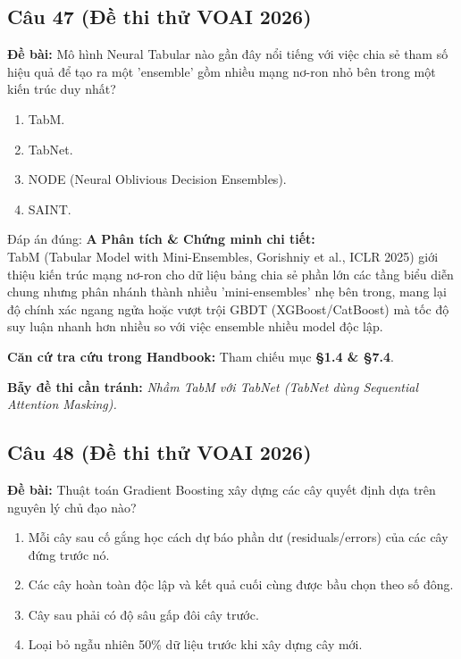 \documentclass[10pt,a4paper]{article}
\begin{document}
\subsection*{Câu 47 (Đề thi thử VOAI 2026)}
\textbf{Đề bài:} Mô hình Neural Tabular nào gần đây nổi tiếng với việc chia sẻ tham số hiệu quả để tạo ra một 'ensemble' gồm nhiều mạng nơ-ron nhỏ bên trong một kiến trúc duy nhất?

\begin{enumerate}[label=\textbf{\Alph*.}]
    \item TabM.
    \item TabNet.
    \item NODE (Neural Oblivious Decision Ensembles).
    \item SAINT.
\end{enumerate}

\begin{solbox}{Đáp án đúng: \textbf{A}}
\textbf{Phân tích \& Chứng minh chi tiết:} \\
TabM (Tabular Model with Mini-Ensembles, Gorishniy et al., ICLR 2025) giới thiệu kiến trúc mạng nơ-ron cho dữ liệu bảng chia sẻ phần lớn các tầng biểu diễn chung nhưng phân nhánh thành nhiều 'mini-ensembles' nhẹ bên trong, mang lại độ chính xác ngang ngửa hoặc vượt trội GBDT (XGBoost/CatBoost) mà tốc độ suy luận nhanh hơn nhiều so với việc ensemble nhiều model độc lập.

\vspace{0.4em}
\textbf{Căn cứ tra cứu trong Handbook:} Tham chiếu mục \textbf{§1.4 \& §7.4}.

\vspace{0.4em}
\textbf{Bẫy đề thi cần tránh:} \textit{Nhầm TabM với TabNet (TabNet dùng Sequential Attention Masking).}
\end{solbox}
\vspace{0.5em}


\subsection*{Câu 48 (Đề thi thử VOAI 2026)}
\textbf{Đề bài:} Thuật toán Gradient Boosting xây dựng các cây quyết định dựa trên nguyên lý chủ đạo nào?

\begin{enumerate}[label=\textbf{\Alph*.}]
    \item Mỗi cây sau cố gắng học cách dự báo phần dư (residuals/errors) của các cây đứng trước nó.
    \item Các cây hoàn toàn độc lập và kết quả cuối cùng được bầu chọn theo số đông.
    \item Cây sau phải có độ sâu gấp đôi cây trước.
    \item Loại bỏ ngẫu nhiên 50\% dữ liệu trước khi xây dựng cây mới.
\end{enumerate}
\end{document}
